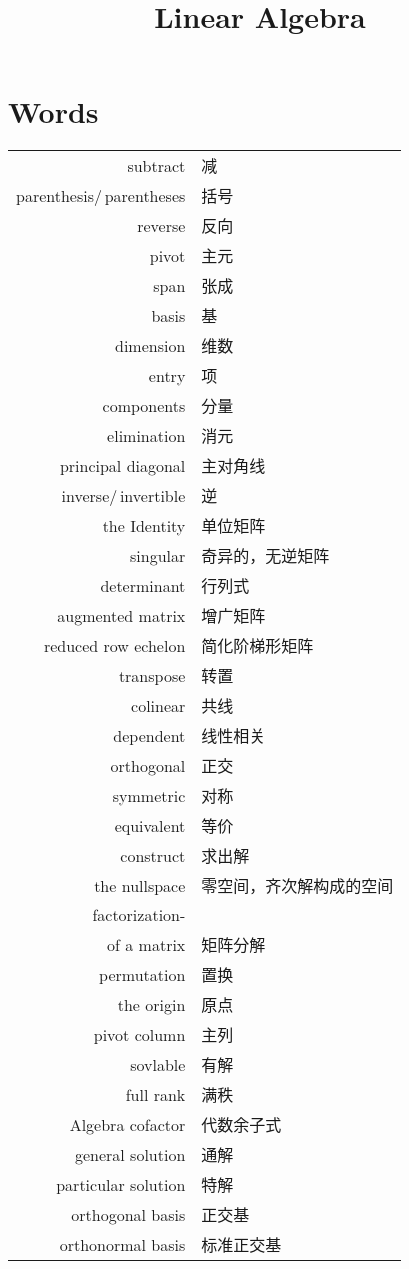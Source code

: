 \documentclass[UTF8,9pt]{ctexart}
\title{Linear Algebra}
\begin{document}
 
\maketitle
\section{Words}
\begin{center}
	\begin{supertabular}{rl}
		subtract&减\\
		parenthesis/\,parentheses&括号\\
		reverse&反向\\
		pivot&主元\\  
		span&张成\\ 
		basis&基\\  
		dimension&维数\\
		entry&项\\  
		components&分量\\ 
		elimination&消元\\
		principal diagonal&主对角线\\
		inverse/\,invertible&逆\\
		the Identity&单位矩阵\\
		singular&奇异的，无逆矩阵\\
		determinant&行列式\\
		augmented matrix&增广矩阵\\
		reduced row echelon&简化阶梯形矩阵\\
		transpose&转置\\
		colinear&共线\\
		dependent&线性相关\\
		orthogonal&正交\\
		symmetric&对称\\
		equivalent&等价\\
		construct&求出解\\
		the nullspace&零空间，齐次解构成的空间\\
		factorization-&\\
		of a matrix&矩阵分解\\
		permutation&置换\\
		the origin&原点\\
		pivot column&主列\\
		sovlable&有解\\
		full rank&满秩\\
		Algebra cofactor&代数余子式\\
		general solution&通解\\
		particular solution&特解\\
		orthogonal basis&正交基\\
		orthonormal basis&标准正交基\\


\end{supertabular}
\end{center}
\end{document}
